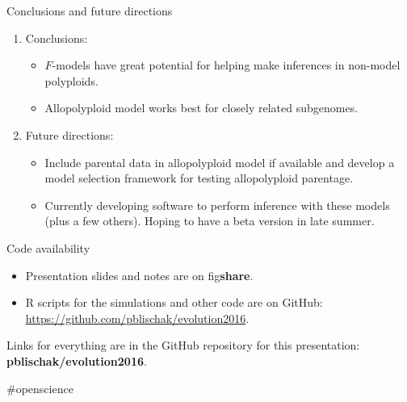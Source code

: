 \documentclass[presentation,sansserif]{beamer}
\begin{document}
\begin{frame}[t]{Conclusions and future directions}
	\pause
	\fontsize{10pt}{10}\selectfont
	\begin{enumerate}
		\item{Conclusions:}
		\vspace{0.1in}
		\setlength\itemsep{0.2in}
		\begin{itemize}
			\setlength\itemsep{0.2in}
			\item $F$-models have great potential for helping make inferences in non-model polyploids.
			\item Allopolyploid model works best for closely related subgenomes.
		\end{itemize}
		\pause
		\item{Future directions:}
		\vspace{0.1in}
		\setlength\itemsep{0.2in}
		\begin{itemize}
		\setlength\itemsep{0.2in}
			\item Include parental data in allopolyploid model if available and develop a model selection framework for testing allopolyploid parentage. \pause
			\item Currently developing software to perform inference with these models (plus a few others). Hoping to have a beta version in late summer.
		\end{itemize}
	\end{enumerate}

\end{frame}

\begin{frame}[c]{Code availability}
	\fontsize{10pt}{10}\selectfont
	\begin{itemize}
	\setlength\itemsep{0.3in}

		\item Presentation slides and notes are on fig\textbf{share}.
		
		\item R scripts for the simulations and other code are on GitHub:\\[0.05in]\url{https://github.com/pblischak/evolution2016}.
		
		
	\end{itemize}
	\vspace{0.3in}

	{\Large \alert{Links for everything are in the GitHub repository for this presentation: \textbf{pblischak/evolution2016}.}}
	\vspace{0.2in}

	\hfill {\tiny \#openscience}
\end{frame}
\end{document}
